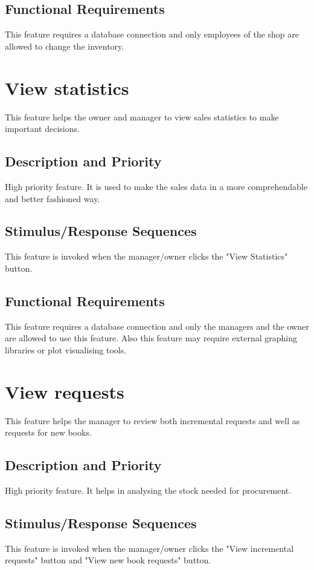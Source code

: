 \documentclass{scrreprt}
\begin{document}
\subsection{Functional Requirements}
This feature requires a database connection and only employees of the shop are allowed to change the inventory.


\section{View statistics}

This feature helps the owner and manager to view sales statistics to make important decisions.
\subsection{Description and Priority}
High priority feature. It is used to make the sales data in a more comprehendable and better fashioned way.

\subsection{Stimulus/Response Sequences}
This feature is invoked when the manager/owner clicks the "View Statistics" button. 

\subsection{Functional Requirements}
This feature requires a database connection and only the managers and the owner are allowed to use this feature. Also this feature may require external graphing libraries or plot visualising tools.

\section{View requests}

This feature helps the manager to review both incremental requests and well as requests for new books.
\subsection{Description and Priority}
High priority feature. It helps in analysing the stock needed for procurement.

\subsection{Stimulus/Response Sequences}
This feature is invoked when the manager/owner clicks the "View incremental requests" button and "View new book requests" button. 
\end{document}
